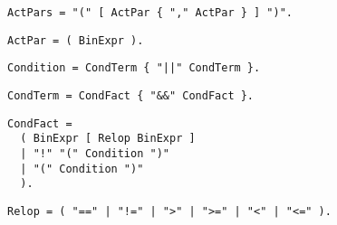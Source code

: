 \begin{samepage}
\begin{lstlisting}[language=EBNF]
ActPars = "(" [ ActPar { "," ActPar } ] ")".
\end{lstlisting}
\end{samepage}


\begin{samepage}
\begin{lstlisting}[language=EBNF]
ActPar = ( BinExpr ).
\end{lstlisting}
\end{samepage}


\begin{samepage}
\begin{lstlisting}[language=EBNF]
Condition = CondTerm { "||" CondTerm }.
\end{lstlisting}
\end{samepage}


\begin{samepage}
\begin{lstlisting}[language=EBNF]
CondTerm = CondFact { "&&" CondFact }.
\end{lstlisting}
\end{samepage}


\begin{samepage}
\begin{lstlisting}[language=EBNF]
CondFact = 
  ( BinExpr [ Relop BinExpr ] 
  | "!" "(" Condition ")" 
  | "(" Condition ")" 
  ).
\end{lstlisting}
\end{samepage}


\begin{samepage}
\begin{lstlisting}[language=EBNF]
Relop = ( "==" | "!=" | ">" | ">=" | "<" | "<=" ).
\end{lstlisting}
\end{samepage}

